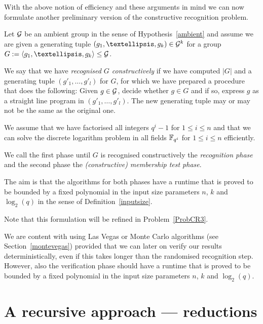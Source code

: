 With the above notion of efficiency and these arguments in mind we can now 
formulate another preliminary version of the constructive recognition problem.

\begin{Problem}
\label{ProbCR2}%
Let $\mathcal{G}$ be an ambient group in the sense of Hypothesis~\ref{ambient} and 
assume we are given a generating tuple $(g_1, \ldots, g_k) \in
\GG^k$ for a group $G := \left< g_1, \ldots, g_k \right> \le \GG$. 

We say that we have \emph{recognised $G$ constructively} if we have 
computed $|G|$ and a
generating tuple $( g'_1, \ldots, g'_l )$ for $G$, for which we have
prepared a procedure that does the following: Given $g \in \mathcal{G}$,
decide whether $g \in G$ and if so, express $g$ as a straight line program
%
in $(g'_1, \ldots, g'_l)$. The new generating tuple may or may not be the
same as the original one.

We assume that we have factorised all integers $q^i-1$ for $1 \le i \le n$
and that we can solve the discrete logarithm problem in all fields
$\mathbb{F}_{q^i}$ for $1 \le i \le n$ efficiently. 

We call the first phase until $G$ is
recognised constructively the \emph{recognition phase} and the second
phase the \emph{(constructive) membership test phase}.

The aim is that the algorithms for both phases have a runtime that is proved
to be bounded by a fixed polynomial in the input size parameters $n$, $k$
and $\log_2(q)$ in the sense of Definition~\ref{inputsize}.
\proofend
\end{Problem}

Note that this formulation will be refined in Problem~\ref{ProbCR3}.

\begin{Rem}
%
We are content with using Las Vegas or Monte Carlo algorithms (see
Section~\ref{montevegas}) provided that we can later on verify our results
deterministically, even if this takes longer than the randomised
recognition step. However, also the verification phase should have a
%
runtime that is proved to be bounded by a fixed polynomial in the input
size parameters $n$, $k$ and $\log_2(q)$.
\end{Rem}

\section{A recursive approach --- reductions}
\label{recapproach}
%

